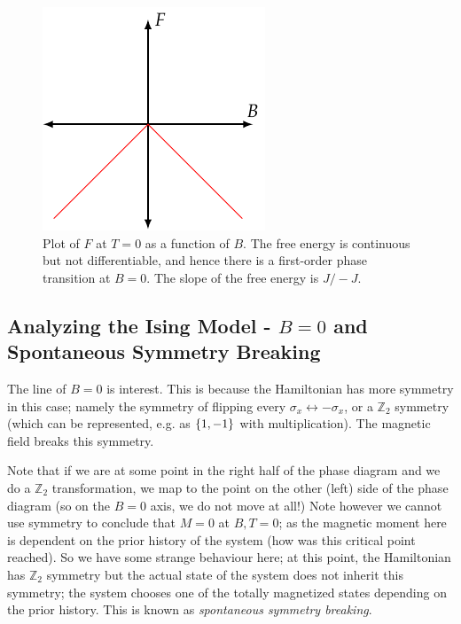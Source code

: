 \begin{figure}[htbp]
    \centering
    \includegraphics{Images/fig-FT0Ising.pdf}
    
    \caption{Plot of $F$ at $T = 0$ as a function of $B$. The free energy is continuous but not differentiable, and hence there is a first-order phase transition at $B = 0$. The slope of the free energy is $J/-J$.}
    \label{fig-FT0Ising}
\end{figure}

\subsection{Analyzing the Ising Model - $B = 0$ and Spontaneous Symmetry Breaking}
The line of $B = 0$ is interest. This is because the Hamiltonian has more symmetry in this case; namely the symmetry of flipping every $\sigma_x \leftrightarrow -\sigma_x$, or a $\mathbb{Z}_2$ symmetry (which can be represented, e.g. as $\set{1, -1}$ with multiplication). The magnetic field breaks this symmetry.

Note that if we are at some point in the right half of the phase diagram and we do a $\mathbb{Z}_2$ transformation, we map to the point on the other (left) side of the phase diagram (so on the $B = 0$ axis, we do not move at all!) Note however we cannot use symmetry to conclude that $M = 0$ at $B, T = 0$; as the magnetic moment here is dependent on the prior history of the system (how was this critical point reached). So we have some strange behaviour here; at this point, the Hamiltonian has $\mathbb{Z}_2$ symmetry but the actual state of the system does not inherit this symmetry; the system chooses one of the totally magnetized states depending on the prior history. This is known as \emph{spontaneous symmetry breaking}.

